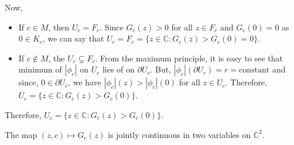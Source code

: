 \noindent Now,
\begin{itemize}
	\item If \( c\in M \), then \( U_c=F_c \). Since \( G_c(z)>0 \)
		for all \( z\in F_c \) and \( G_c(0)=0 \) as \( 0\in K_c \),
		we can say that \( U_c=F_c=\{z\in \mathbb{C}:G_c(z)>G_c(0)=0\} \).
	\item If \( c\not\in M \), the \( U_c \subsetneq F_c \). From the maximum principle,
		it is easy to see that minimum of \( |\phi_c| \) on \( \overline{U_c} \) lies of on \( \partial U_c \).
   	But, \( |\phi_c|(\partial U_c)=r=\text{constant} \) and since, \( 0\in \partial U_c \), we have \( |\phi_c|(z)>|\phi_c|(0) \)
		for all \( z \in  U_c \). Therefore, \( U_c=\{z\in \mathbb{C}:G_c(z)>G_c(0)\} \).
\end{itemize}
Therefore, \( U_c=\{z\in \mathbb{C}:G_c(z)>G_c(0)\} \).
\begin{lemma}
	The map \( (z,c)\mapsto G_c(z) \) is jointly continuous in two variables on \( \mathbb{C}^2 \).
\end{lemma}

